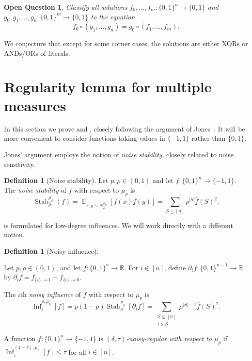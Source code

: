 \documentclass{article}
\newtheorem{open}{Open Question}
\theoremstyle{definition}
\newtheorem{definition}[theorem]{Definition}
\theoremstyle{remark}
\DeclareMathOperator*{\E}{\mathbb{E}}
\DeclareMathOperator{\Inf}{Inf}
\DeclareMathOperator{\Stab}{Stab}
\renewcommand\leq{\leqslant}
\begin{document}
\begin{open}
Classify all solutions $f_0,\ldots,f_m\colon \{0,1\}^n \to \{0,1\}$ and $g_0,g_1,\ldots,g_n\colon \{0,1\}^m \to \{0,1\}$ to the equation
\[
 f_0 \circ (g_1,\ldots,g_n) = g_0 \circ (f_1,\ldots,f_m).
\]
\end{open}

We conjecture that except for some corner cases, the solutions are either XORs or ANDs/ORs of literals.




\appendix

\section{Regularity lemma for multiple measures}
\label{apx:jones}

In this section we prove  and , closely following the argument of Jones~\cite{Jones}. It will be more convenient to consider functions taking values in $\{-1,1\}$ rather than $\{0,1\}$.

Jones' argument employs the notion of \emph{noise stability}, closely related to noise sensitivity.

\begin{definition}[Noise stability] \label{def:noise-stability}
Let $p,\rho \in (0,1)$ and let $f\colon \{0,1\}^n \to \{-1,1\}$. The \emph{noise stability} of $f$ with respect to $\mu_p$ is
\[
 \Stab_\rho^{\mu_p}(f) = \E_{x,y \sim N_\rho^{\mu_p}}[f(x)f(y)] = \sum_{S \subseteq [n]} \rho^{|S|} \hat{f}(S)^2.
\]
\end{definition}

 is formulated for low-degree influences. We will work directly with a different notion.

\begin{definition}[Noisy influence]
\label{def:noisy-influence}

Let $p,\rho \in (0,1)$, and let $f\colon \{0,1\}^n \to \mathbb{R}$. For $i \in [n]$, define $\partial_i f\colon \{0,1\}^{n-1} \to \mathbb{R}$ by $\partial_i f = f_{\{i\} \to 1} - f_{\{i\} \to 0}$.

The $i$th \emph{noisy influence} of $f$ with respect to $\mu_p$ is
\[
 \Inf_i^{\rho,\mu_p}[f] = p(1-p) \Stab_\rho^{\mu_p}[\partial_i f] =
 \sum_{\substack{S \subseteq [n] \\ i \in S}} \rho^{|S|-1} \hat{f}(S)^2.
\]

A function $f\colon \{0,1\}^n \to \{-1,1\}$ is \emph{$(\delta,\tau)$-noisy-regular with respect to $\mu_p$} if $\Inf_i^{(1-\delta),\mu_p}[f] \leq \tau$ for all $i \in [n]$.
\end{definition}
\end{document}

